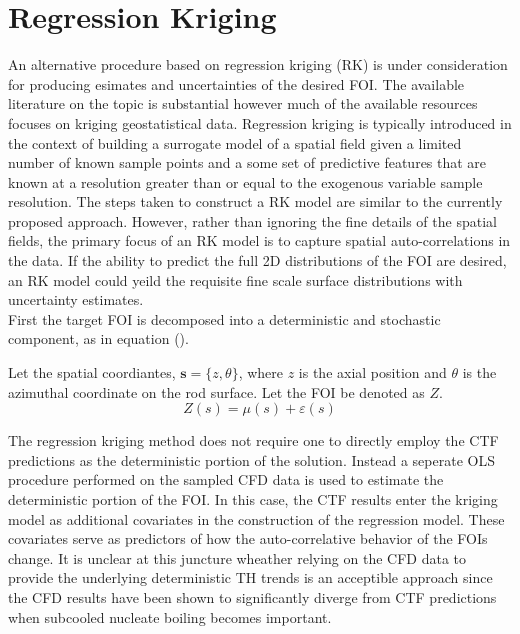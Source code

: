 \section{Regression Kriging}

An alternative procedure based on regression kriging (RK) is under consideration for producing esimates and uncertainties of the desired FOI.
The available literature on the topic is substantial however much of the available resources focuses on kriging geostatistical data.  Regression kriging is typically introduced in the context of building
a surrogate model of a spatial field given a limited number of known sample points and a some set of predictive features that are known at a resolution greater than or equal to the exogenous variable sample resolution.
The steps taken to construct a RK model are similar to the currently proposed approach.  However, rather than ignoring the fine details of the spatial fields, the primary focus of an RK model is to capture spatial auto-correlations in the data.   If the ability to predict the full 2D distributions of the FOI are desired, an RK model could yeild the requisite fine scale surface distributions with uncertainty estimates. \\

First the target FOI is decomposed into a deterministic and stochastic component, as in equation ().

Let the spatial coordiantes, $\mathbf{s} = \{z, \theta\}$,
where $z$ is the axial position and $\theta$ is the azimuthal coordinate on the rod surface. Let the FOI be denoted as $Z$.
\begin{equation}
Z(s) = \mu(s) + \varepsilon(s)
\end{equation}

The regression kriging method does not require one to directly employ the
CTF predictions as the deterministic portion of the solution.   
Instead
a seperate OLS procedure performed on the sampled CFD data is used to estimate the deterministic portion of the FOI.
In this case, the CTF results enter the kriging model as additional covariates in the construction of the regression model.  These covariates serve as predictors of how the auto-correlative behavior of the FOIs change.
It is unclear at this juncture wheather relying on the CFD data to provide the underlying deterministic TH trends  is an acceptible approach since the CFD results have been shown to significantly diverge from
CTF predictions when subcooled nucleate boiling becomes important.

